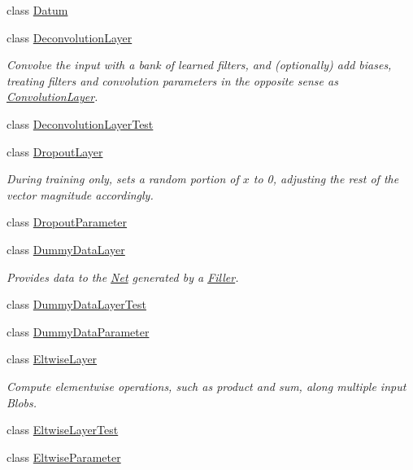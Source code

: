 \begin{DoxyCompactItemize}
class \mbox{\hyperlink{classcaffe_1_1_datum}{Datum}}
\item 
class \mbox{\hyperlink{classcaffe_1_1_deconvolution_layer}{Deconvolution\+Layer}}
\begin{DoxyCompactList}\small\item\em Convolve the input with a bank of learned filters, and (optionally) add biases, treating filters and convolution parameters in the opposite sense as \mbox{\hyperlink{classcaffe_1_1_convolution_layer}{Convolution\+Layer}}. \end{DoxyCompactList}\item 
class \mbox{\hyperlink{classcaffe_1_1_deconvolution_layer_test}{Deconvolution\+Layer\+Test}}
\item 
class \mbox{\hyperlink{classcaffe_1_1_dropout_layer}{Dropout\+Layer}}
\begin{DoxyCompactList}\small\item\em During training only, sets a random portion of $x$ to 0, adjusting the rest of the vector magnitude accordingly. \end{DoxyCompactList}\item 
class \mbox{\hyperlink{classcaffe_1_1_dropout_parameter}{Dropout\+Parameter}}
\item 
class \mbox{\hyperlink{classcaffe_1_1_dummy_data_layer}{Dummy\+Data\+Layer}}
\begin{DoxyCompactList}\small\item\em Provides data to the \mbox{\hyperlink{classcaffe_1_1_net}{Net}} generated by a \mbox{\hyperlink{classcaffe_1_1_filler}{Filler}}. \end{DoxyCompactList}\item 
class \mbox{\hyperlink{classcaffe_1_1_dummy_data_layer_test}{Dummy\+Data\+Layer\+Test}}
\item 
class \mbox{\hyperlink{classcaffe_1_1_dummy_data_parameter}{Dummy\+Data\+Parameter}}
\item 
class \mbox{\hyperlink{classcaffe_1_1_eltwise_layer}{Eltwise\+Layer}}
\begin{DoxyCompactList}\small\item\em Compute elementwise operations, such as product and sum, along multiple input Blobs. \end{DoxyCompactList}\item 
class \mbox{\hyperlink{classcaffe_1_1_eltwise_layer_test}{Eltwise\+Layer\+Test}}
\item 
class \mbox{\hyperlink{classcaffe_1_1_eltwise_parameter}{Eltwise\+Parameter}}
\item 

\end{DoxyCompactItemize}
